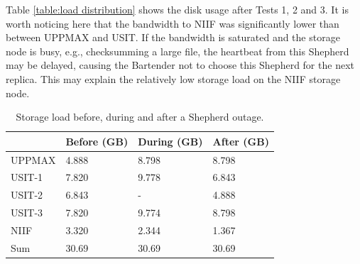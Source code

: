 \documentclass[final]{ieee}
\begin{document}
Table \ref{table:load distribution} shows the disk usage after Tests
1, 2 and 3. It is worth noticing here that the bandwidth to NIIF was
significantly lower than between UPPMAX and USIT. If the bandwidth is
saturated and the storage node is busy, e.g., checksumming a
large file, the heartbeat from this Shepherd may be delayed, causing the
Bartender not to choose this Shepherd for the next replica. This may explain the
relatively low storage load on the  NIIF storage node.


\begin{table}[ht]
\centering
\begin{tabular}[width = \columnwidth]{llll}
\hline \hline
&\small{Before (GB)}&\small{During (GB)}&\small{After (GB)}\\
\hline
\small{UPPMAX}&4.888&8.798&8.798\\
\small{USIT-1}&7.820&9.778&6.843\\
\small{USIT-2}&6.843&-    &4.888\\
\small{USIT-3}&7.820&9.774&8.798\\
\small{NIIF}  &3.320&2.344&1.367\\
\hline
\small{Sum}&30.69&30.69&30.69\\
\hline
\end{tabular}
\caption{Storage load before, during and after a Shepherd outage.}
\label{table:self healing}  
\end{table}      
\end{document}
